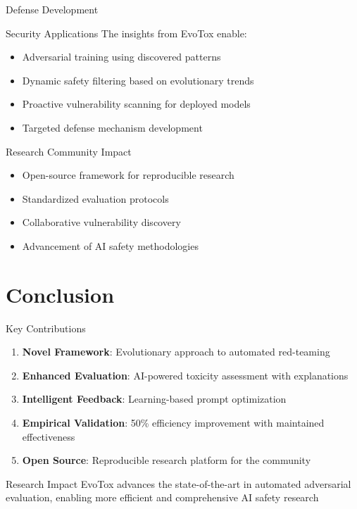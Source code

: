 \documentclass[aspectratio=169]{beamer}
\begin{document}
\begin{frame}{Defense Development}
\begin{block}{Security Applications}
The insights from EvoTox enable:
\begin{itemize}
\item Adversarial training using discovered patterns
\item Dynamic safety filtering based on evolutionary trends
\item Proactive vulnerability scanning for deployed models
\item Targeted defense mechanism development
\end{itemize}
\end{block}

\begin{block}{Research Community Impact}
\begin{itemize}
\item Open-source framework for reproducible research
\item Standardized evaluation protocols
\item Collaborative vulnerability discovery
\item Advancement of AI safety methodologies
\end{itemize}
\end{block}
\end{frame}

\section{Conclusion}

\begin{frame}{Key Contributions}
\begin{enumerate}
\item \textbf{Novel Framework}: Evolutionary approach to automated red-teaming
\item \textbf{Enhanced Evaluation}: AI-powered toxicity assessment with explanations
\item \textbf{Intelligent Feedback}: Learning-based prompt optimization
\item \textbf{Empirical Validation}: 50\% efficiency improvement with maintained effectiveness
\item \textbf{Open Source}: Reproducible research platform for the community
\end{enumerate}

\vspace{0.5cm}
\begin{block}{Research Impact}
EvoTox advances the state-of-the-art in automated adversarial evaluation, enabling more efficient and comprehensive AI safety research
\end{block}
\end{frame}
\end{document}
